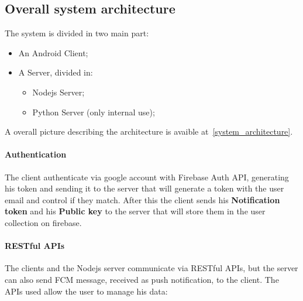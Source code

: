 \documentclass[../../main]{subfiles}
\begin{document}
\label{ss:overall-system-architecture}
\subsection{Overall system architecture}
The system is divided in two main part:
    \begin{itemize}
        \item An Android Client;
        \item A Server, divided in:
        \begin{itemize}
            \item Nodejs Server;
            \item Python Server (only internal use);
        \end{itemize}
    \end{itemize}
A overall picture describing the architecture is avaible at\ \ref{system_architecture}.

\paragraph*{Authentication}
The client authenticate via google account with Firebase Auth API, generating his token and sending it to the server 
that will generate a token with the user email and control if they match. After this the client sends 
his \textbf{Notification token} and his \textbf{Public key} to the server that will store them in the user collection on firebase.

\paragraph*{RESTful APIs}
The clients and the Nodejs server communicate via RESTful APIs, but the server can also send FCM message, received as push notification, to the client.
The APIs used allow the user to manage his data:
\end{document}
